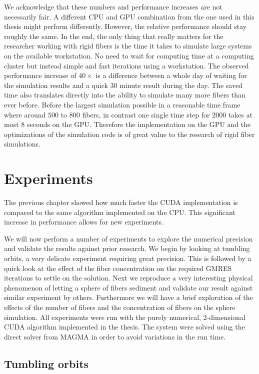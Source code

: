 \documentclass[a4paper,11pt]{kth-mag}
\begin{document}
We acknowledge that these numbers and performance increases are not necessarily fair. A different CPU and GPU combination from the one used in this thesis might perform differently. However, the relative performance should stay roughly the same. In the end, the only thing that really matters for the researcher working with rigid fibers is the time it takes to simulate large systems on the available workstation. No need to wait for computing time at a computing cluster but instead simple and fast iterations using a workstation. The observed performance increase of $40×$ is a difference between a whole day of waiting for the simulation results and a quick $30$ minute result during the day. The saved time also translates directly into the ability to simulate many more fibers than ever before. Before the largest simulation possible in a reasonable time frame where around $500$ to $800$ fibers, in contrast one single time step for $2000$ takes at most $8$ seconds on the GPU. Therefore the implementation on the GPU and the optimizations of the simulation code is of great value to the research of rigid fiber simulations.

\chapter{Experiments}
\label{cha:experiments}

The previous chapter showed how much faster the CUDA implementation is compared to the same algorithm implemented on the CPU. This significant increase in performance allows for new experiments.

We will now perform a number of experiments to explore the numerical precision and validate the results against prior research. We begin by looking at tumbling orbits, a very delicate experiment requiring great precision. This is followed by a quick look at the effect of the fiber concentration on the required GMRES iterations to settle on the solution. Next we reproduce a very interesting physical phenomenon of letting a sphere of fibers sediment and validate our result against similar experiment by others. Furthermore we will have a brief exploration of the effects of the number of fibers and the concentration of fibers on the sphere simulation. All experiments were run with the purely numerical, 2-dimensional CUDA algorithm  implemented in the thesis. The system were solved using the direct solver from MAGMA in order to avoid variations in the run time.

\section{Tumbling orbits}
\label{sec:example_ring}
\end{document}

